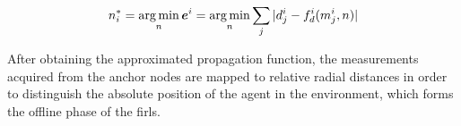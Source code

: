     \begin{equation}
      n^*_i = \operatorname*{arg\,min}_n \bm{e}^i  = \operatorname*{arg\,min}_n \sum_j |d^i_j - f^i_d(m^i_j, n)|
    \end{equation}

    After obtaining the approximated propagation function, the measurements acquired from the anchor nodes are mapped to relative radial distances in order to distinguish the absolute position of the agent in the environment, which forms the offline phase of the \gls{firl}s.
